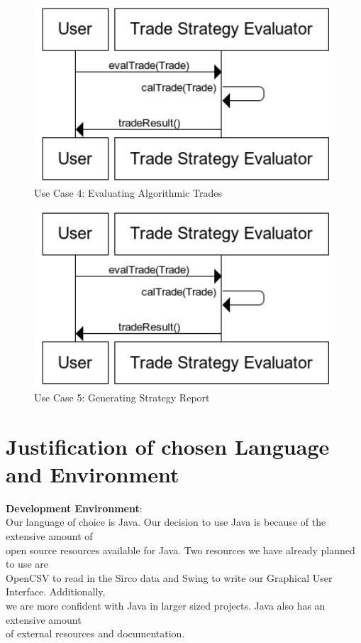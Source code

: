 \documentclass[a4paper]{article}
\begin{document}
\begin{figure}[H]
   \includegraphics[width=1\textwidth]{images/authenticationSeq}
   \caption{Use Case 4: Evaluating Algorithmic Trades}
\end{figure}

\begin{figure}[H]
   \includegraphics[width=1\textwidth]{images/authenticationSeq}
   \caption{Use Case 5: Generating Strategy Report}
\end{figure}

\newpage

\section {Justification of chosen Language and Environment}

{\bf Development Environment}: \\
\indent Our language of choice is Java. Our decision to use Java is because of the extensive amount of \\ 
open source resources available for Java. Two resources we have already planned to use are \\
OpenCSV to read in the Sirco data and Swing to write our Graphical User Interface. Additionally, \\
we are more confident with Java in larger sized projects. Java also has an extensive amount  \\
of external resources and documentation. \\
\end{document}
